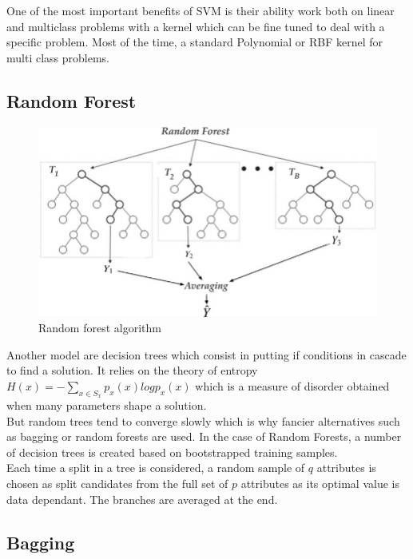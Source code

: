 \documentclass[a4paper,12pt,twoside,twocolumn]{article}
\begin{document}
One of the most important benefits of SVM is their ability work both on linear and multiclass problems with a kernel which can be fine tuned to deal with a specific problem. Most of the time, a standard Polynomial or RBF kernel for multi class problems.\\

\subsection{Random Forest}
\label{sec:orga340817}

\begin{center}
\begin{figure}[htbp]
\centering
\includegraphics[width=.9\linewidth]{./images/forest.png}
\caption{Random forest algorithm}
\end{figure}
\end{center}

Another model are decision trees which consist in putting if conditions in cascade to find a solution. It relies on the theory of entropy \(H(x) = - \sum_{x \in S_x} p_x(x) log p_x (x)\) which is a measure of disorder obtained when many parameters shape a solution.\\

But random trees tend to converge slowly which is why fancier alternatives such as bagging or random forests are used. In the case of Random Forests, a number of decision trees is created based on bootstrapped training samples.\\

Each time a split in a tree is considered, a random sample of \(q\) attributes is chosen as split candidates from the full set of \(p\) attributes as its optimal value is data dependant. The branches are averaged at the end.\\

\subsection{Bagging}
\label{sec:org572cc01}
\end{document}
